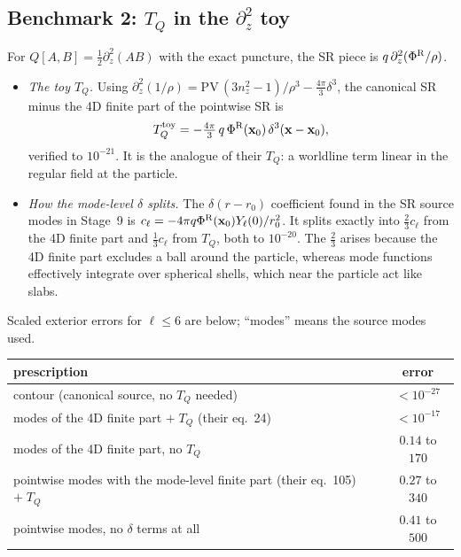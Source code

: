 \documentclass[11pt,a4paper]{article}
\newcommand{\PhiR}{\Phi^{\rm R}}
\newcommand{\x}{\mathbf{x}}
\begin{document}
\subsection{Benchmark 2: \texorpdfstring{$T_Q$}{T\_Q} in the \texorpdfstring{$\partial_z^2$}{d\_z\^2} toy}
For $Q[A,B]=\tfrac12\partial_z^2(AB)$ with the exact puncture, the SR piece is $q\,\partial_z^2(\PhiR/\rho)$.
\begin{itemize}[nosep]
\item \emph{The toy $T_Q$.}
  Using $\partial_z^2(1/\rho)=\mathrm{PV}\,(3n_z^2-1)/\rho^3-\tfrac{4\pi}{3}\delta^3$, the canonical SR minus the 4D finite part of the pointwise SR is
  \begin{equation}
  T_Q^{\rm toy}=-\tfrac{4\pi}{3}\,q\,\PhiR(\x_0)\,\delta^3(\x-\x_0),
  \end{equation}
  verified to $10^{-21}$. It is the analogue of their $T_Q$: a worldline term linear in the regular field at the particle.
\item \emph{How the mode-level $\delta$ splits.}
  The $\delta(r-r_0)$ coefficient found in the SR source modes in Stage~9 is $c_\ell=-4\pi q\PhiR(\x_0)Y_\ell(0)/r_0^2$.
  It splits exactly into $\tfrac23c_\ell$ from the 4D finite part and $\tfrac13c_\ell$ from $T_Q$, both to $10^{-20}$.
  The $\tfrac23$ arises because the 4D finite part excludes a ball around the particle, whereas mode functions effectively integrate over spherical shells, which near the particle act like slabs.
\end{itemize}

Scaled exterior errors for $\ell\le6$ are below; ``modes'' means the source modes used.
\begin{center}
\small
\renewcommand{\arraystretch}{1.15}
\begin{tabular}{@{}lc@{}}
\toprule
prescription & error\\
\midrule
contour (canonical source, no $T_Q$ needed) & $<10^{-27}$\\
modes of the 4D finite part $+\;T_Q$ (their eq.~24) & $<10^{-17}$\\
modes of the 4D finite part, no $T_Q$ & $0.14$ to $170$\\
pointwise modes with the mode-level finite part (their eq.~105) $+\;T_Q$ & $0.27$ to $340$\\
pointwise modes, no $\delta$ terms at all & $0.41$ to $500$\\
\bottomrule
\end{tabular}
\end{center}
\end{document}
